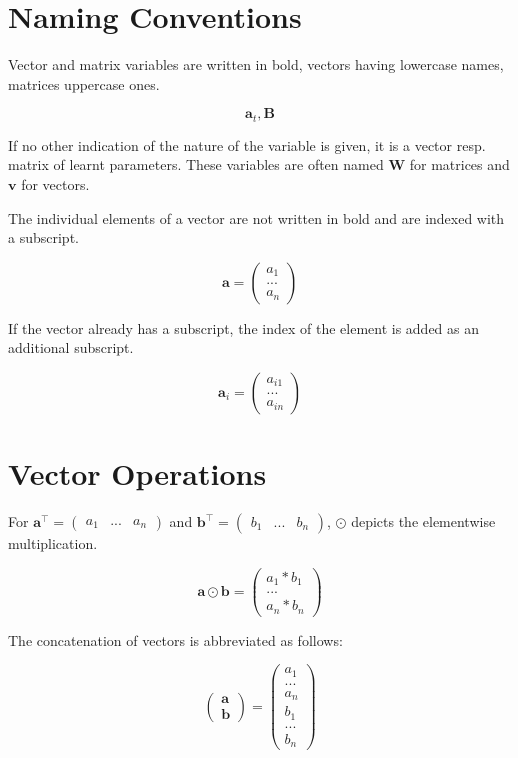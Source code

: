 \section{Naming Conventions}

Vector and matrix variables are written in bold, vectors having lowercase names, matrices uppercase ones.

\begin{equation*}
  \mathbf{a}_t, \mathbf{B}
\end{equation*}

If no other indication of the nature of the variable is given, it is a vector resp. matrix of learnt parameters. These variables are often named \(\mathbf{W}\) for matrices and \(\mathbf{v}\) for vectors.

\bigskip

The individual elements of a vector are not written in bold and are indexed with a subscript.

\begin{equation*}
  \mathbf{a} = \begin{pmatrix} a_1 \\ ... \\ a_n \end{pmatrix}
\end{equation*}

If the vector already has a subscript, the index of the element is added as an additional subscript.

\begin{equation*}
  \mathbf{a}_i = \begin{pmatrix} a_{i1} \\ ... \\ a_{in} \end{pmatrix}
\end{equation*}

\section{Vector Operations}

For \(\mathbf{a}^\intercal = \begin{pmatrix} a_1 & ... & a_n \end{pmatrix}\) and \(\mathbf{b}^\intercal = \begin{pmatrix} b_1 & ... & b_n \end{pmatrix}\), \(\odot\) depicts the elementwise multiplication.

\begin{equation*}
  \mathbf{a} \odot \mathbf{b} = \begin{pmatrix} a_1 * b_1 \\ ... \\ a_n * b_n \end{pmatrix}
\end{equation*}

The concatenation of vectors is abbreviated as follows:

\begin{equation*}
  \begin{pmatrix} \mathbf{a} \\ \mathbf{b} \end{pmatrix} = \begin{pmatrix} a_1 \\ ... \\ a_n \\ b_1 \\ ... \\ b_n \end{pmatrix}
\end{equation*}
